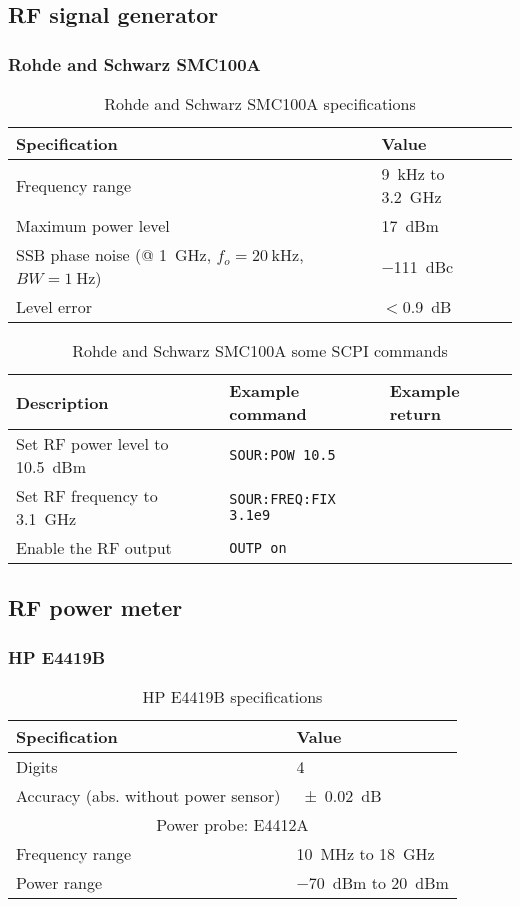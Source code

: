 \subsection{RF signal generator}
\subsubsection{Rohde and Schwarz SMC100A}
\begin{table}[H]
	\centering
	\caption{Rohde and Schwarz SMC100A specifications}
	\label{tab:rs-smc100a-specs}
	\begin{tabularx}{\textwidth}{ll}
		\toprule
		\textbf{Specification} & \textbf{Value}\\
		\midrule
		Frequency range & \SI{9}{\kHz} to \SI{3.2}{\GHz}\\
		Maximum power level & \SI{17}{dBm}\\
		SSB phase noise (@ \SI{1}{\GHz}, $f_o=\SI{20}{\kHz}$, $BW=\SI{1}{\Hz}$) & \SI{-111}{dBc}\\
		Level error & $<$\SI{0.9}{\dB}\\
		\bottomrule
	\end{tabularx}
\end{table}

\begin{table}[H]
	\centering
	\caption{Rohde and Schwarz SMC100A some SCPI commands}
	\label{tab:rs-smc100a-scpi}
	\begin{tabularx}{\textwidth}{Xll}
		\toprule
		\textbf{Description} & \textbf{Example command} & \textbf{Example return}\\
		\midrule
		Set RF power level to \SI{10.5}{dBm} & \texttt{SOUR:POW 10.5} & \\
		Set RF frequency to \SI{3.1}{\GHz}& \texttt{SOUR:FREQ:FIX {3.1e9}} & \\
		Enable the RF output & \texttt{OUTP on} & \\
		\bottomrule
	\end{tabularx}
\end{table}

\subsection{RF power meter}
\subsubsection{HP E4419B}
\begin{table}[H]
	\centering
	\caption{HP E4419B specifications}
	\label{tab:hp-E4419B-specs}
	\begin{tabularx}{\textwidth}{ll}
		\toprule
		\textbf{Specification} & \textbf{Value}\\
		\midrule
		Digits & 4\\
		Accuracy (abs. without power sensor) & \SI{+-0.02}{\dB} \\
		\multicolumn{2}{c}{Power probe: E4412A}\\
		Frequency range & \SI{10}{\MHz} to \SI{18}{\GHz}\\
		Power range & \SI{-70}{dBm} to \SI{20}{dBm}\\
		\bottomrule
	\end{tabularx}
\end{table}

